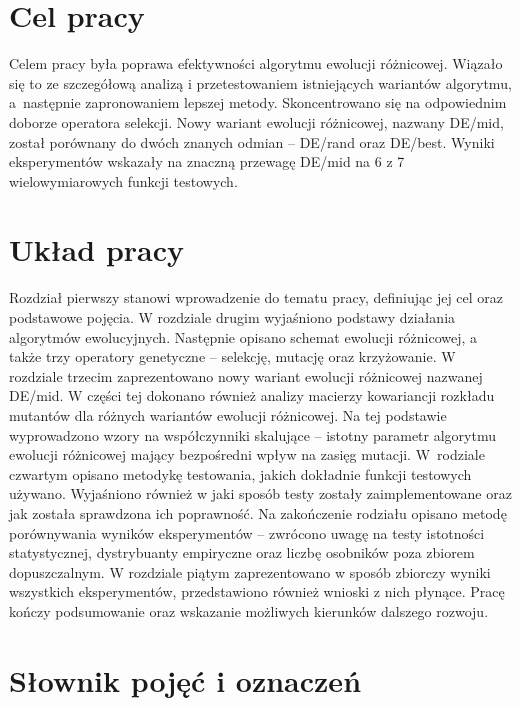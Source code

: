 \documentclass[a4paper,onecolumn,oneside,12pt,wide,floatssmall]{mwrep}
\theoremstyle{definition}
\theoremstyle{plain}%
\theoremstyle{remark}
\begin{document}
\section{Cel pracy}

Celem pracy była poprawa efektywności algorytmu ewolucji różnicowej.
Wiązało się to ze szczegółową analizą i przetestowaniem istniejących wariantów algorytmu,
a~następnie zapronowaniem lepszej metody. 
Skoncentrowano się na odpowiednim doborze operatora selekcji.
Nowy wariant ewolucji różnicowej, nazwany DE/mid, został porównany 
do dwóch znanych odmian -- DE/rand oraz DE/best. 
Wyniki eksperymentów wskazały na znaczną przewagę DE/mid na 6 z 7 wielowymiarowych 
funkcji testowych.

\section{Układ pracy}

Rozdział pierwszy stanowi wprowadzenie do tematu pracy, definiując jej cel oraz podstawowe pojęcia.
W rozdziale drugim wyjaśniono podstawy działania algorytmów ewolucyjnych. 
Następnie opisano schemat ewolucji różnicowej, a także trzy operatory genetyczne -- selekcję,
mutację oraz krzyżowanie. 
W rozdziale trzecim zaprezentowano nowy wariant ewolucji różnicowej nazwanej DE/mid. 
W części tej dokonano również analizy macierzy kowariancji rozkładu mutantów dla różnych wariantów ewolucji
różnicowej. Na tej podstawie wyprowadzono 
wzory na współczynniki skalujące -- istotny parametr algorytmu ewolucji różnicowej mający bezpośredni
wpływ na zasięg mutacji. 
W~rodziale czwartym opisano metodykę testowania, jakich dokładnie funkcji testowych 
używano.
Wyjaśniono również w jaki sposób testy zostały 
zaimplementowane oraz jak została sprawdzona ich poprawność. Na zakończenie rodziału opisano
metodę porównywania wyników eksperymentów -- zwrócono uwagę na testy istotności 
statystycznej, dystrybuanty empiryczne oraz liczbę osobników poza zbiorem dopuszczalnym.
W rozdziale piątym zaprezentowano w sposób zbiorczy wyniki wszystkich eksperymentów,
przedstawiono również wnioski z nich płynące. 
Pracę kończy podsumowanie oraz wskazanie możliwych kierunków dalszego rozwoju.

\section{Słownik pojęć i oznaczeń}
\end{document}
